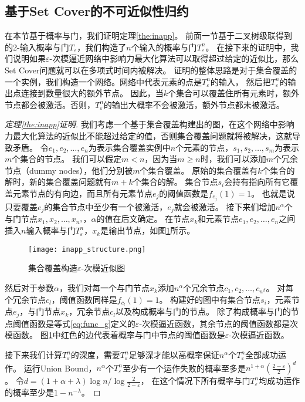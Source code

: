 \subsection{基于Set Cover的不可近似性归约}
在本节基于概率与门，我们证明定理\ref{the:inapp}。
前面一节基于二叉树级联得到的2-输入概率与门$T_\varepsilon$，我们构造了$n$个输入的概率与门$T_\varepsilon^n$。
在接下来的证明中，我们说明如果$\varepsilon$-次模逼近网络中影响力最大化算法可以取得超过给定的近似比，那么Set Cover问题就可以在多项式时间内被解决。
证明的整体思路是对于集合覆盖的一个实例，我们构造一个网络。网络中代表元素的点是$T_\varepsilon^n$的输入，
然后把$T_\varepsilon^n$的输出点连接到数量很大的额外节点。
因此，当$k$个集合可以覆盖住所有元素时，额外节点都会被激活。否则，$T_\varepsilon^n$的输出大概率不会被激活，额外节点都未被激活。

\begin{proof}[定理\ref{the:inapp}证明]
我们考虑一个基于集合覆盖构建出的图，在这个网络中影响力最大化算法的近似比不能超过给定的值，否则集合覆盖问题就将被解决，这就导致矛盾。
令$e_1, e_2, \dots, e_n$为表示集合覆盖实例中$n$个元素的节点，$s_1, s_2, \dots, s_m$为表示$m$个集合的节点。
我们可以假定$m<n$，因为当$m\geq n$时，我们可以添加$m$个冗余节点（dummy nodes），他们分别被$m$个集合覆盖。
原始的集合覆盖有$k$个集合的解时，新的集合覆盖问题就有$m+k$个集合的解。
集合节点$s_i$会持有指向所有它覆盖元素节点的有向边，而且所有元素节点$e_j$的阈值函数是$f_{e_j}(1)=1$。
也就是说只要覆盖$e_j$的集合节点中至少有一个被激活，$e_j$就会被激活。
接下来们增加$n^\alpha$个与门节点$x_1, x_2, \dots, x_{n^\alpha}$，$\alpha$的值在后文确定。
在节点$x_k$和元素节点$e_1, e_2, \dots, e_n$之间插入$n$输入概率与门$T_\varepsilon^n$，$x_k$是输出节点，如图\ref{fig:inapp_structure}所示。
\begin{figure}[h]
	\centering
	\texttt{[image: inapp\_structure.png]}
	\caption{集合覆盖构造$\varepsilon$-次模近似图}\label{fig:inapp_structure}
\end{figure}
然后对于参数$\alpha$，我们对每一个与门节点$x_k$添加$n^\alpha$个冗余节点$c_1, c_2, \dots, c_{n^\beta}$。
对每个冗余节点$c_l$，阈值函数同样是$f_{c_l}(1)=1$。
构建好的图中有集合节点$s_i$，元素节点$e_j$，与门节点$x_k$，冗余节点$c_l$以及构成概率与门的节点。
除了构成概率与门的节点阈值函数是等式\ref{eq:func_g}定义的$\varepsilon$-次模逼近函数，其余节点的阈值函数都是次模函数。
图\ref{fig:inapp_structure}中红色的边代表着概率与门中节点的阈值函数是$\varepsilon$-次模逼近函数。

接下来我们计算$T_\varepsilon^n$的深度，需要$T_\varepsilon^n$足够深才能以高概率保证$n^\alpha$个$T_\varepsilon^n$全部成功运作。
运行Union Bound，$n^\alpha$个$T_\varepsilon^n$至少有一个运作失败的概率至多是$n^{1+\alpha}(\frac{2-\varepsilon}{2})^{d}$。
令$d = (1+\alpha+\lambda)\log n / \log{\frac{2}{2-\varepsilon}}$，
在这个情况下所有概率与门$T_\varepsilon^n$均成功运作的概率至少是$1-n^{-\lambda}$。


\end{proof}
